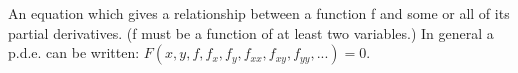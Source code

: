 An equation which gives a relationship between a function f and some or all
of its partial derivatives. (f must be a function of at least two variables.)
In general a p.d.e. can be written: $F(x,y,f,f_{x},f_{y},f_{xx},f_{xy},f_{yy},...)=0.$ 